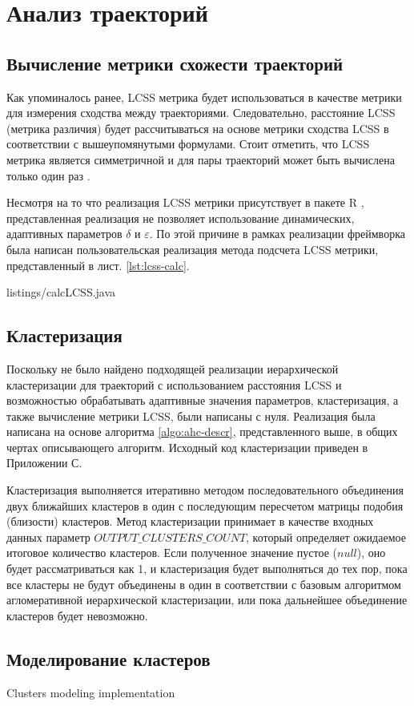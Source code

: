 \section{Анализ траекторий}
\subsection{Вычисление метрики схожести траекторий}

Как упоминалось ранее, LCSS метрика будет использоваться в качестве метрики для измерения сходства между траекториями. Следовательно, расстояние LCSS (метрика различия) будет рассчитываться на основе метрики сходства LCSS в соответствии с вышеупомянутыми формулами. Стоит отметить, что LCSS метрика является симметричной и для пары траекторий может быть вычислена только один раз \cite{inproceedings:28_lcss_dsmt}.

Несмотря на то что реализация LCSS метрики присутствует в пакете R \cite{online:r_lcss}, представленная реализация не позволяет использование динамических, адаптивных параметров $\delta$ и $\varepsilon$. По этой причине в рамках реализации фреймворка была написан пользовательская реализация метода подсчета LCSS метрики, представленный в лист. \ref{lst:lcss-calc}.

 {listings/calcLCSS.java}

\subsection{Кластеризация}

Поскольку не было найдено подходящей реализации иерархической кластеризации для траекторий с использованием расстояния LCSS и возможностью обрабатывать адаптивные значения параметров, кластеризация, а также вычисление метрики LCSS, были написаны с нуля. Реализация была написана на основе алгоритма \ref{algo:ahc-descr}, представленного выше, в общих чертах описывающего алгоритм. Исходный код кластеризации приведен в Приложении С.

Кластеризация выполняется итеративно методом последовательного объединения двух ближайших кластеров в один с последующим пересчетом матрицы подобия (близости) кластеров. Метод кластеризации принимает в качестве входных данных параметр $OUTPUT\_CLUSTERS\_COUNT$, который определяет ожидаемое итоговое количество кластеров. Если полученное значение пустое ($null$), оно будет рассматриваться как 1, и кластеризация будет выполняться до тех пор, пока все кластеры не будут объединены в один в соответствии с базовым алгоритмом агломеративной иерархической кластеризации, или пока дальнейшее объединение кластеров будет невозможно.

\subsection{Моделирование кластеров}

Clusters modeling implementation